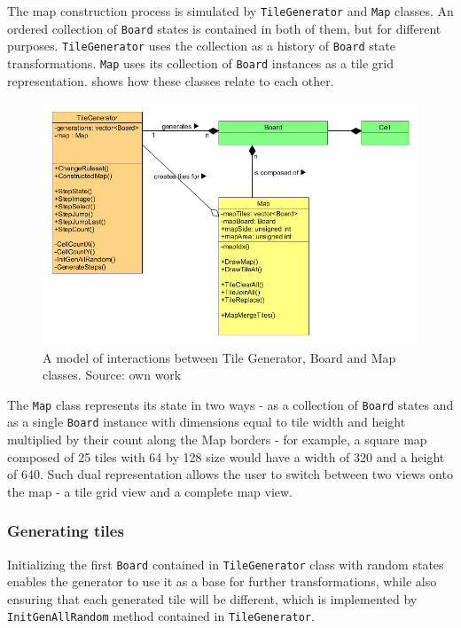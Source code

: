 \documentclass[12pt]{report}
\begin{document}
The map construction process is simulated by \texttt{TileGenerator} and \texttt{Map} classes. An ordered collection of \texttt{Board} states is contained in both of them, but for different purposes. \texttt{TileGenerator} uses the collection as a history of \texttt{Board} state transformations. \texttt{Map} uses its collection of \texttt{Board} instances as a tile grid representation.  shows how these classes relate to each other.

\begin{figure}[H]
	\centering
	\includegraphics[width=0.9\linewidth]{diagrams/tilegenerator_map}
	\caption{ A model of interactions between Tile Generator, Board and Map classes. Source: own work}
	\label{fig:tilegeneratormap}
\end{figure}

The \texttt{Map} class represents its state in two ways - as a collection of \texttt{Board} states and as a single \texttt{Board} instance with dimensions equal to tile width and height multiplied by their count along the Map borders - for example, a square map composed of 25 tiles with 64 by 128 size would have a width of 320 and a height of 640. Such dual representation allows the user to switch between two views onto the map - a tile grid view and a complete map view.

\subsubsection{Generating tiles}

Initializing the first \texttt{Board} contained in \texttt{TileGenerator} class with random states enables the generator to use it as a base for further transformations, while also ensuring that each generated tile will be different, which is implemented by \texttt{InitGenAllRandom} method contained in \texttt{TileGenerator}.   
\end{document}
